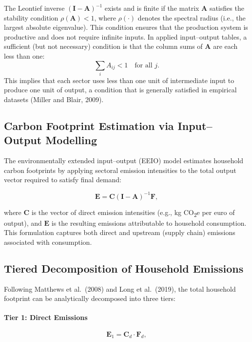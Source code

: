 \documentclass[12pt,a4paper]{article}%
\begin{document}
The Leontief inverse \( (\mathbf{I} - \mathbf{A})^{-1} \) exists and is finite if the matrix \( \mathbf{A} \) satisfies the stability condition \( \rho(\mathbf{A}) < 1 \), where \( \rho(\cdot) \) denotes the spectral radius (i.e., the largest absolute eigenvalue). This condition ensures that the production system is productive and does not require infinite inputs. In applied input--output tables, a sufficient (but not necessary) condition is that the column sums of \( \mathbf{A} \) are each less than one:
\[
\sum_i A_{ij} < 1 \quad \text{for all } j.
\]
This implies that each sector uses less than one unit of intermediate input to produce one unit of output, a condition that is generally satisfied in empirical datasets (Miller and Blair, 2009).

\subsection{Carbon Footprint Estimation via Input–Output Modelling}

The environmentally extended input–output (EEIO) model estimates household carbon footprints by applying sectoral emission intensities to the total output vector required to satisfy final demand:

\begin{equation}
\mathbf{E} = \mathbf{C} (\mathbf{I} - \mathbf{A})^{-1} \mathbf{F},
\end{equation}

where \( \mathbf{C} \) is the vector of direct emission intensities (e.g., kg CO\textsubscript{2}e per euro of output), and \( \mathbf{E} \) is the resulting emissions attributable to household consumption. This formulation captures both direct and upstream (supply chain) emissions associated with consumption.

\subsection{Tiered Decomposition of Household Emissions}

Following Matthews et al.~(2008) and Long et al.~(2019), the total household footprint can be analytically decomposed into three tiers:

\paragraph{Tier 1: Direct Emissions}

\begin{equation}
\mathbf{E}_1 = \mathbf{C}_d \cdot \mathbf{F}_d,
\end{equation}
\end{document}
